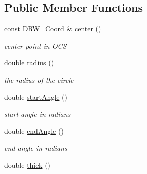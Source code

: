 \subsection*{Public Member Functions}
\begin{DoxyCompactItemize}
\item 
\hypertarget{class_d_r_w___arc_a1d2d880ea3dcfd52429d9a9c4cb680d2}{}const \hyperlink{class_d_r_w___coord}{D\+R\+W\+\_\+\+Coord} \& \hyperlink{class_d_r_w___arc_a1d2d880ea3dcfd52429d9a9c4cb680d2}{center} ()\label{class_d_r_w___arc_a1d2d880ea3dcfd52429d9a9c4cb680d2}

\begin{DoxyCompactList}\small\item\em center point in O\+C\+S \end{DoxyCompactList}\item 
\hypertarget{class_d_r_w___arc_a22792839d56bb40f5f01fcf8000f1c8d}{}double \hyperlink{class_d_r_w___arc_a22792839d56bb40f5f01fcf8000f1c8d}{radius} ()\label{class_d_r_w___arc_a22792839d56bb40f5f01fcf8000f1c8d}

\begin{DoxyCompactList}\small\item\em the radius of the circle \end{DoxyCompactList}\item 
\hypertarget{class_d_r_w___arc_adae2ce7765f7572c747ee13c82ef55a7}{}double \hyperlink{class_d_r_w___arc_adae2ce7765f7572c747ee13c82ef55a7}{start\+Angle} ()\label{class_d_r_w___arc_adae2ce7765f7572c747ee13c82ef55a7}

\begin{DoxyCompactList}\small\item\em start angle in radians \end{DoxyCompactList}\item 
\hypertarget{class_d_r_w___arc_aa11139680c3bc9d63eb266968d4aa5fb}{}double \hyperlink{class_d_r_w___arc_aa11139680c3bc9d63eb266968d4aa5fb}{end\+Angle} ()\label{class_d_r_w___arc_aa11139680c3bc9d63eb266968d4aa5fb}

\begin{DoxyCompactList}\small\item\em end angle in radians \end{DoxyCompactList}\item 
\hypertarget{class_d_r_w___arc_a59fbfc76b5fd2846a447a2f34c8ed1c0}{}double \hyperlink{class_d_r_w___arc_a59fbfc76b5fd2846a447a2f34c8ed1c0}{thick} ()\label{class_d_r_w___arc_a59fbfc76b5fd2846a447a2f34c8ed1c0}


\end{DoxyCompactItemize}
